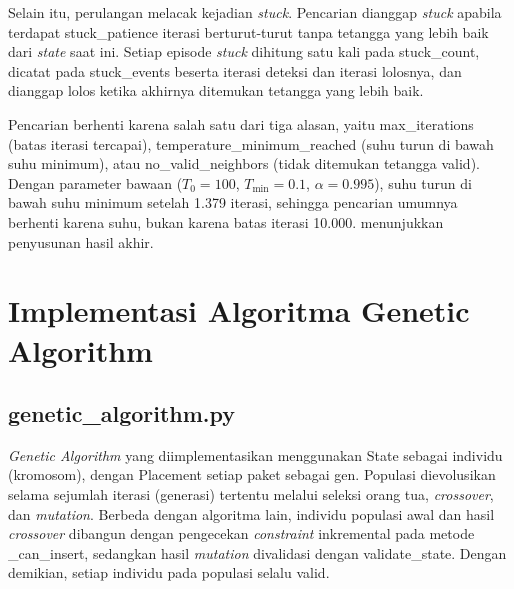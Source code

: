 Selain itu, perulangan melacak kejadian \textit{stuck}. Pencarian dianggap \textit{stuck} apabila terdapat stuck\_patience iterasi berturut-turut tanpa tetangga yang lebih baik dari \textit{state} saat ini. Setiap episode \textit{stuck} dihitung satu kali pada stuck\_count, dicatat pada stuck\_events beserta iterasi deteksi dan iterasi lolosnya, dan dianggap lolos ketika akhirnya ditemukan tetangga yang lebih baik.


Pencarian berhenti karena salah satu dari tiga alasan, yaitu max\_iterations (batas iterasi tercapai), temperature\_minimum\_reached (suhu turun di bawah suhu minimum), atau no\_valid\_neighbors (tidak ditemukan tetangga valid). Dengan parameter bawaan ($T_0 = 100$, $T_{\min} = 0.1$, $\alpha = 0.995$), suhu turun di bawah suhu minimum setelah 1.379 iterasi, sehingga pencarian umumnya berhenti karena suhu, bukan karena batas iterasi 10.000.  menunjukkan penyusunan hasil akhir.


\section{Implementasi Algoritma Genetic Algorithm}
\label{sec:ga-impl}

\subsection{genetic\_algorithm.py}

\textit{Genetic Algorithm} yang diimplementasikan menggunakan State sebagai individu (kromosom), dengan Placement setiap paket sebagai gen. Populasi dievolusikan selama sejumlah iterasi (generasi) tertentu melalui seleksi orang tua, \textit{crossover}, dan \textit{mutation}. Berbeda dengan algoritma lain, individu populasi awal dan hasil \textit{crossover} dibangun dengan pengecekan \textit{constraint} inkremental pada metode \_can\_insert, sedangkan hasil \textit{mutation} divalidasi dengan validate\_state. Dengan demikian, setiap individu pada populasi selalu valid.

